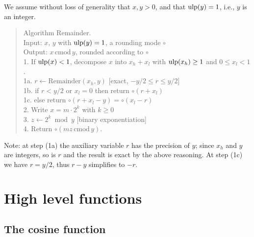 \documentclass[12pt]{amsart}
\def\ulp{{\rm ulp}}
\def\cmod{\,\mathrm{cmod}\,}
\begin{document}
We assume without loss of generality that $x, y > 0$, and that
$\ulp(y) = 1$, i.e., $y$ is an integer.
\begin{quote}
Algorithm Remainder. \\
Input: $x$, $y$ with $\ulp(y)=1$, a rounding mode $\circ$ \\
Output: $x \cmod y$, rounded according to $\circ$ \\
1. If $\ulp(x) < 1$, decompose $x$ into $x_h + x_l$ with $\ulp(x_h) \geq 1$
   and $0 \leq x_l < 1$. \\
1a. $r \leftarrow \mathrm{Remainder}(x_h, y)$ [exact, $-y/2 \leq r \leq y/2$]\\
1b. if $r < y/2$ or $x_l = 0$ then return $\circ(r + x_l)$ \\
1c. else return $\circ(r + x_l - y) = \circ(x_l - r)$ \\
2. Write $x = m \cdot 2^k$ with $k \geq 0$ \\
3. $z \leftarrow 2^k \bmod y$ [binary exponentiation] \\
4. Return $\circ(mz \cmod y)$.
\end{quote}
Note: at step (1a) the auxiliary variable $r$ has the precision of $y$;
since $x_h$ and $y$ are integers, so is $r$ and the result is exact by the
above reasoning. At step (1c) we have $r=y/2$, thus $r-y$ simplifies to $-r$.

\section{High level functions}

\subsection{The cosine function}
\end{document}
